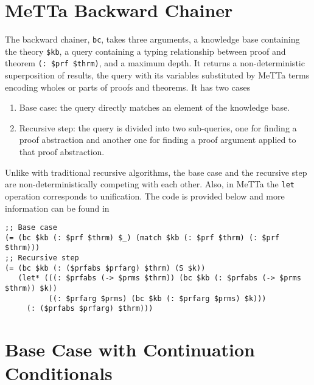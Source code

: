 \documentclass{easychair}
\begin{document}



\label{sect:bib}
%
%
%


\appendix
\section{MeTTa Backward Chainer}
\label{app:metta-backward-chainer}

The backward chainer, \texttt{bc}, takes three arguments, a knowledge
base containing the theory \texttt{\$kb}, a query containing a typing
relationship between proof and theorem \texttt{(: \$prf \$thrm)}, and
a maximum depth.  It returns a non-deterministic superposition of
results, the query with its variables substituted by MeTTa terms
encoding wholes or parts of proofs and theorems.  It has two cases
\begin{enumerate}
\item Base case: the query directly matches an element of the
  knowledge base.
\item Recursive step: the query is divided into two sub-queries, one
  for finding a proof abstraction and another one for finding a proof
  argument applied to that proof abstraction.
\end{enumerate}
Unlike with traditional recursive algorithms, the base case and the
recursive step are non-deterministically competing with each other.
Also, in MeTTa the \texttt{let} operation corresponds to unification.
The code is provided below and more information can be found
in~\cite{Geisweiller2024ICM} \small{
\begin{verbatim}
;; Base case
(= (bc $kb (: $prf $thrm) $_) (match $kb (: $prf $thrm) (: $prf $thrm)))
;; Recursive step
(= (bc $kb (: ($prfabs $prfarg) $thrm) (S $k))
   (let* (((: $prfabs (-> $prms $thrm)) (bc $kb (: $prfabs (-> $prms $thrm)) $k))
          ((: $prfarg $prms) (bc $kb (: $prfarg $prms) $k)))
     (: ($prfabs $prfarg) $thrm)))
\end{verbatim}
}

\section{Base Case with Continuation Conditionals}
\label{app:backward-chainer-continuation-conditionals}
\end{document}
